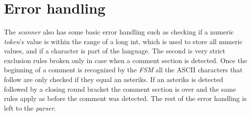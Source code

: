 	\section{Error handling}
	\paragraph{}
		The \textit{scanner} also has some basic error handling such as checking if a numeric \textit{token}'s value is within the range of a long int, which is used to store all numeric values, and if a character is part of the language. The second is very strict exclusion rules broken only in case when a comment section is detected. Once the beginning of a comment is recognized by the \textit{FSM} all the ASCII characters that follow are only checked if they equal an asteriks. If an asteriks is detected followed by a closing round bracket the comment section is over and the same rules apply as before the comment was detected. The rest of the error handling is left to the \textit{parser}.